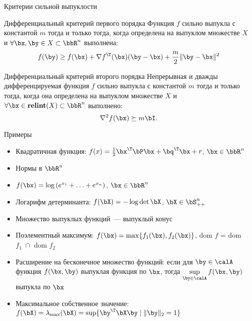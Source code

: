 \documentclass[12pt,russian]{beamer}
\begin{document}
\begin{frame}{Критерии сильной выпуклости}

\begin{block}{Дифференциальный критерий первого порядка}
Функция $f$ сильно выпукла с константой $m$ тогда и только тогда, когда определена на выпуклом множестве $X$ и $\forall \bx, \by \in X \subset \bbR^n$ выполнена:
\vspace{-4mm}
\[
f(\by) \geq f(\bx) + \nabla f^{\T}(\bx)(\by - \bx) + \frac{m}{2}\| \by - \bx \|^2
\]
\end{block}

\begin{block}{Дифференциальный критерий второго порядка}
Непрерывная и дважды дифференцируемая функция $f$ сильно выпукла с константой $m$ тогда и только тогда, когда она определена на выпуклом множестве $X$ и $\forall \bx \in \text{\bf relint}(X) \subset \bbR^n$ выполнено:
\vspace{-2mm}
\[
\nabla^2 f(\bx) \succeq m\bI.
\]
\end{block}
\end{frame}

\begin{frame}{Примеры}
\begin{itemize}
\item Квадратичная функция: $f(x) = \frac{1}{2}\bx^{\T}\bP\bx + \bq^{\T}\bx + r$, $\bx \in \bbR^n$
\item Нормы в $\bbR^n$
\item $f(\bx) = \log{(e^{x_1} + \ldots + e^{x_n})}$, $\bx \in \bbR^n$
\item Логарифм детерминанта: $f(\bX) = -\log{\det{\bX}}$, $\bX \in \bS^n_{++}$
\item Множество выпуклых функций~--- выпуклый конус
\item Поэлементный максимум: $f(\bx) = \max\{f_1(\bx), f_2(\bx)\}$, dom $f$ = dom $f_1 \; \cap $ dom $f_2$
\item Расширение на бесконечное множество функций: если для $\by \in \calA$ функция $f(\bx, \by)$ выпуклая функция по $\bx$, тогда $\sup\limits_{\by \in \calA} f(\bx, \by) $ выпукла по $\bx$
\item Максимальное собственное значение: $f(\bX) = \lambda_{\max}(\bX) = \sup\{\by^{\T}\bX\by \; | \; \|\by\|_2 = 1\}$ 

\end{itemize}
\end{frame}
\end{document}

